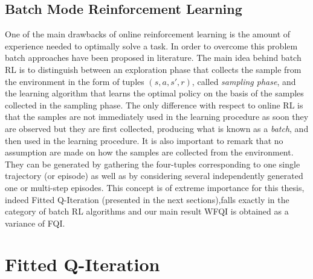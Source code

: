 \subsection{Batch Mode Reinforcement Learning}
	\noindent One of the main drawbacks of online reinforcement learning is the amount of experience needed to optimally solve a task.
	In order to overcome this problem batch approaches have been proposed in literature. The main idea behind batch RL is
	to distinguish between an exploration phase that collects the sample from the environment in the form of tuples
	$(s,a,s',r)$, called \textit{sampling phase}, and the learning algorithm that learns the optimal policy on the basis of
	the samples collected in the sampling phase. The only difference with respect to online RL is that the samples are not
	immediately used in the learning procedure as soon they are observed but they are first collected, producing what is
	known as a \textit{batch}, and then used in the learning procedure.\newline
	It is also important to remark that no assumption are made on how the samples are collected from the environment.
	They can be generated by gathering the four-tuples corresponding to one single trajectory (or episode) as well as
	by considering several independently generated one or multi-step episodes.
	This concept is of extreme importance for this thesis, indeed Fitted Q-Iteration (presented in the next sections),falls
	exactly in the category of batch RL algorithms and our main result WFQI is obtained as a variance of FQI.

	\section{Fitted Q-Iteration}

